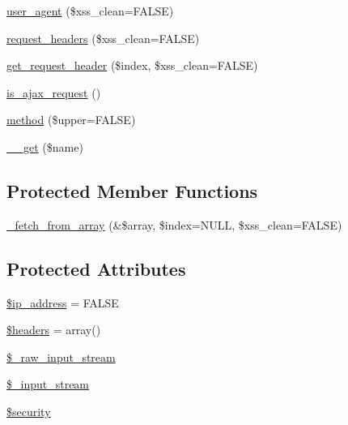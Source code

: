 \begin{DoxyCompactItemize}
\item 
\mbox{\hyperlink{class_c_i___input_a06f18bf3a46ff9072369efd601b5659f}{user\+\_\+agent}} (\$xss\+\_\+clean=F\+A\+L\+SE)
\item 
\mbox{\hyperlink{class_c_i___input_a4bc8f8c9a9488ff359a61f1fb60e6097}{request\+\_\+headers}} (\$xss\+\_\+clean=F\+A\+L\+SE)
\item 
\mbox{\hyperlink{class_c_i___input_a099af71b54f9edbfb20576a4e8a3df41}{get\+\_\+request\+\_\+header}} (\$index, \$xss\+\_\+clean=F\+A\+L\+SE)
\item 
\mbox{\hyperlink{class_c_i___input_a4ae07120b0b2ace90eb2f7ec72b29426}{is\+\_\+ajax\+\_\+request}} ()
\item 
\mbox{\hyperlink{class_c_i___input_aaa22626885bdf9dda2346ee6422203ef}{method}} (\$upper=F\+A\+L\+SE)
\item 
\mbox{\hyperlink{class_c_i___input_abc8e9e31bb15c8a44c3210ec551407c8}{\+\_\+\+\_\+get}} (\$name)
\end{DoxyCompactItemize}
\subsection*{Protected Member Functions}
\begin{DoxyCompactItemize}
\item 
\mbox{\hyperlink{class_c_i___input_a0582daeab86697987bf682eb967743dd}{\+\_\+fetch\+\_\+from\+\_\+array}} (\&\$array, \$index=N\+U\+LL, \$xss\+\_\+clean=F\+A\+L\+SE)
\end{DoxyCompactItemize}
\subsection*{Protected Attributes}
\begin{DoxyCompactItemize}
\item 
\mbox{\hyperlink{class_c_i___input_a614e10d1ab6dcf06fa7fef37af7b7eee}{\$ip\+\_\+address}} = F\+A\+L\+SE
\item 
\mbox{\hyperlink{class_c_i___input_a52500036ee807241b8b4b7e2367c49ef}{\$headers}} = array()
\item 
\mbox{\hyperlink{class_c_i___input_a6f70bcba6388b55275db11f519649441}{\$\+\_\+raw\+\_\+input\+\_\+stream}}
\item 
\mbox{\hyperlink{class_c_i___input_aa67cd17f9c04d6c58d10a80630e4faf2}{\$\+\_\+input\+\_\+stream}}
\item 
\mbox{\hyperlink{class_c_i___input_a7ef3408af92597c92305e22f79e67d61}{\$security}}
\end{DoxyCompactItemize}


